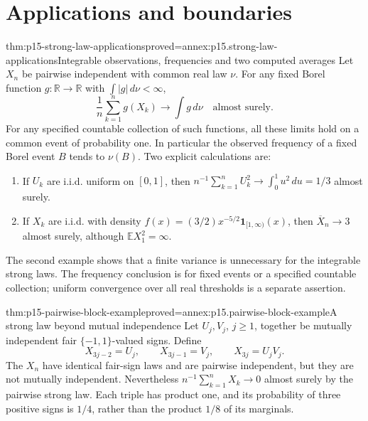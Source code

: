 \section{Applications and boundaries}
\label{sec:p15-strong-law-applications}

\begin{hbtheorem}{thm:p15-strong-law-applications}{proved=annex:p15.strong-law-applications}{Integrable observations, frequencies and two computed averages}
Let \(X_n\) be pairwise independent with common real law \(\nu\).
For any fixed Borel function \(g:\mathbb R\to\mathbb R\) with
\(\int|g|\,d\nu<\infty\),
\[
 \frac1n\sum_{k=1}^ng(X_k)\longrightarrow\int g\,d\nu
                                           \quad\text{almost surely}.
\]
For any specified countable collection of such functions, all these
limits hold on a common event of probability one. In particular the
observed frequency of a fixed Borel event \(B\) tends to \(\nu(B)\).
Two explicit calculations are:
\begin{enumerate}
\item If \(U_k\) are i.i.d. uniform on \([0,1]\), then
\(n^{-1}\sum_{k=1}^nU_k^2\to\int_0^1u^2\,du=1/3\) almost surely.
\item If \(X_k\) are i.i.d. with density
\(f(x)=(3/2)x^{-5/2}\mathbf1_{[1,\infty)}(x)\), then
\(\overline X_n\to3\) almost surely, although
\(\mathbb EX_1^2=\infty\).
\end{enumerate}
The second example shows that a finite variance is unnecessary for the
integrable strong laws. The frequency conclusion is for fixed events
or a specified countable collection; uniform convergence over all real
thresholds is a separate assertion.
\end{hbtheorem}

\begin{hbtheorem}{thm:p15-pairwise-block-example}{proved=annex:p15.pairwise-block-example}{A strong law beyond mutual independence}
Let \(U_j,V_j\), \(j\geq1\), together be mutually independent
fair \(\{-1,1\}\)-valued signs. Define
\[
 X_{3j-2}=U_j,\qquad X_{3j-1}=V_j,\qquad X_{3j}=U_jV_j.
\]
The \(X_n\) have identical fair-sign laws and are pairwise independent,
but they are not mutually independent. Nevertheless
\(n^{-1}\sum_{k=1}^nX_k\to0\) almost surely by the pairwise strong
law. Each triple has product one, and its probability of three positive
signs is \(1/4\), rather than the product \(1/8\) of its marginals.
\end{hbtheorem}

